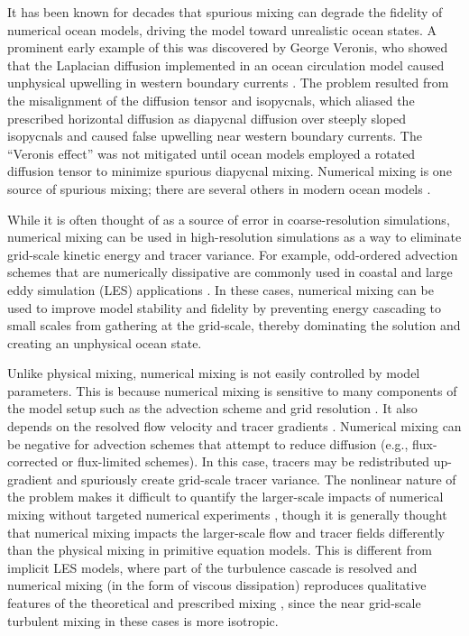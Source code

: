 It has been known for decades that spurious mixing can degrade the fidelity of numerical ocean models, driving the model toward unrealistic ocean states. A prominent early example of this was discovered by George Veronis, who showed that the Laplacian diffusion implemented in an ocean circulation model caused unphysical upwelling in western boundary currents \citep{veronis1975role}. The problem resulted from the misalignment of the diffusion tensor and isopycnals, which aliased the prescribed horizontal diffusion as diapycnal diffusion over steeply sloped isopycnals \citep{Griffies_2000} and caused false upwelling near western boundary currents. The ``Veronis effect'' was not mitigated until ocean models employed a rotated diffusion tensor \citep{redi1982oceanic} to minimize spurious diapycnal mixing. Numerical mixing is one source of spurious mixing; there are several others in modern ocean models \cite[see][]{megann2022assessment}. 

While it is often thought of as a source of error in coarse-resolution simulations, numerical mixing can be used in high-resolution simulations as a way to eliminate grid-scale kinetic energy and tracer variance. For example, odd-ordered advection schemes that are numerically dissipative are commonly used in coastal and large eddy simulation (LES) applications \citep{leonard1993positivity, roman2010large, shchepetkin1998quasi,wu2010advection}. In these cases, numerical mixing can be used to improve model stability and fidelity by preventing energy cascading to small scales from gathering at the grid-scale, thereby dominating the solution and creating an unphysical ocean state.

Unlike physical mixing, numerical mixing is not easily controlled by model parameters. This is because numerical mixing is sensitive to many components of the model setup such as the advection scheme \citep{fofonova2021plume,Kalra_2019, Wang_2021}  and grid resolution \citep{Holmes_2021,Ralston_2017,Schlichting23}. It also depends on the resolved flow velocity and tracer gradients \citep{Schlichting23, Holmes_2021, Wang_2021}. Numerical mixing can be negative for advection schemes that attempt to reduce diffusion (e.g., flux-corrected or flux-limited schemes). In this case, tracers may be redistributed up-gradient and spuriously create grid-scale tracer variance. The nonlinear nature of the problem makes it difficult to quantify the larger-scale impacts of numerical mixing without targeted numerical experiments \citep{fofonova2021plume, Kalra_2019}, though it is generally thought that numerical mixing impacts the larger-scale flow and tracer fields differently than the physical mixing in primitive equation models. This is different from implicit LES models, where part of the turbulence cascade is resolved and numerical mixing (in the form of viscous dissipation) reproduces qualitative features of the theoretical and prescribed mixing \citep{domaradzki2003effective, thornber2007implicit}, since the near grid-scale turbulent mixing in these cases is more isotropic. 

